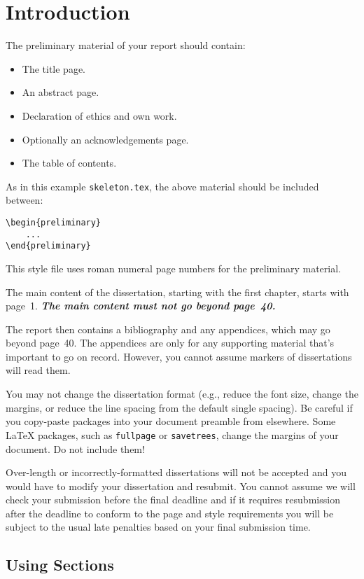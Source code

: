 \documentclass[logo,bsc,singlespacing,parskip]{infthesis}
\theoremstyle{definition}
\theoremstyle{example}
\theoremstyle{theorem}
\theoremstyle{theorem}
\theoremstyle{theorem}
\theoremstyle{theorem}
\theoremstyle{theorem}
\theoremstyle{definition}
\theoremstyle{definition}
\theoremstyle{definition}
\begin{document}
\chapter{Introduction}

The preliminary material of your report should contain:
\begin{itemize}
\item
The title page.
\item
An abstract page.
\item
Declaration of ethics and own work.
\item
Optionally an acknowledgements page.
\item
The table of contents.
\end{itemize}

As in this example \texttt{skeleton.tex}, the above material should be
included between:
\begin{verbatim}
\begin{preliminary}
    ...
\end{preliminary}
\end{verbatim}
This style file uses roman numeral page numbers for the preliminary material.

The main content of the dissertation, starting with the first chapter,
starts with page~1. \emph{\textbf{The main content must not go beyond page~40.}}

The report then contains a bibliography and any appendices, which may go beyond
page~40. The appendices are only for any supporting material that's important to
go on record. However, you cannot assume markers of dissertations will read them.

You may not change the dissertation format (e.g., reduce the font size, change
the margins, or reduce the line spacing from the default single spacing). Be
careful if you copy-paste packages into your document preamble from elsewhere.
Some \LaTeX{} packages, such as \texttt{fullpage} or \texttt{savetrees}, change
the margins of your document. Do not include them!

Over-length or incorrectly-formatted dissertations will not be accepted and you
would have to modify your dissertation and resubmit. You cannot assume we will
check your submission before the final deadline and if it requires resubmission
after the deadline to conform to the page and style requirements you will be
subject to the usual late penalties based on your final submission time.

\section{Using Sections}
\end{document}
